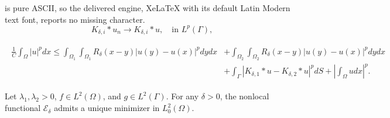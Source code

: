 \documentclass[10pt,a4paper]{amsart}
\begin{document}
is pure ASCII, so the delivered engine, XeLaTeX with its default Latin Modern text font, reports no missing character.
  \begin{equation}\label{eq:Ku:3}
    K_{\delta,i}\ast u_n\rightarrow  K_{\delta,i}\ast u,\quad \mbox{in } L^p(\Gamma),
  \end{equation}

  \begin{align}\label{eq:poincare}
  \begin{split}
    \frac{1}{C}\int_{\Omega} |u|^pdx
    \leq \int_{\Omega_1}\int_{\Omega_1}R_\delta(x-y)|u(y)-u(x)|^pdydx
    &+\int_{\Omega_2}\int_{\Omega_2}R_\delta(x-y)|u(y)-u(x)|^pdydx\\
    &+\int_\Gamma\left|K_{\delta,1}\ast u-K_{\delta,2}\ast u\right|^pdS
    +\left|\int_{\Omega} udx\right|^p.
    \end{split}
  \end{align}

\begin{theorem}\label{th:existence_nonlocal}
  Let $\lambda_1, \lambda_2>0$, $f\in L^2(\Omega)$, and $g\in L^2(\Gamma)$. For any $\delta>0$, the nonlocal functional $\mathcal{E}_\delta$ admits a unique minimizer in $L^2_0(\Omega)$.
\end{theorem}
\end{document}
